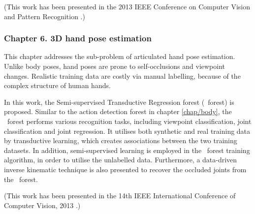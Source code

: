 (This work has been presented in the 2013 IEEE Conference on Computer Vision and Pattern Recognition \cite{Yu2013}.)  

\subsubsection*{Chapter 6. 3D hand pose estimation} 

This chapter addresses the sub-problem of articulated hand pose estimation.  Unlike body poses, hand poses are prone to self-occlusions and viewpoint changes. Realistic training data are costly via manual labelling, because of the complex structure of human hands. 

In this work, the Semi-supervised Transductive Regression forest (\STR\ forest) is proposed. Similar to the action detection forest in chapter \ref{chap/body}, the \STR\ forest performs various recognition tasks, including viewpoint classification, joint classification and joint regression. It utilises both synthetic and real training data by transductive learning, which creates associations between the two training datasets. In addition, semi-supervised learning is employed in the \STR\ forest training algorithm, in order to utilise the unlabelled data.
Furthermore, a data-driven inverse kinematic technique is also presented to recover the occluded joints from the \STR\ forest.

(This work has been presented in the 14th IEEE International Conference of Computer Vision, 2013 \cite{Tang2013}.)
